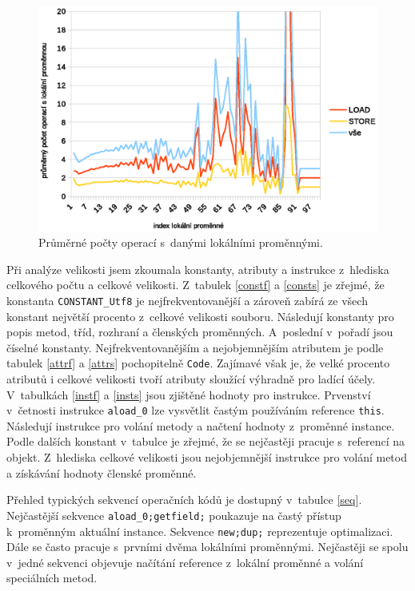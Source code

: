 \begin{figure}[h!]
\centering
\includegraphics[scale=0.9]{fig/locals.eps} 
\caption{Průměrné počty operací s~danými lokálními proměnnými.}\label{vars}
\end{figure}


Při analýze velikosti jsem zkoumala konstanty, atributy a instrukce z~hlediska celkového počtu a celkové velikosti. Z~tabulek \ref{constf} a \ref{consts} je zřejmé, že konstanta \texttt{CONSTANT\_Utf8} je nejfrekventovanější a zároveň zabírá ze všech konstant největší procento z~celkové velikosti souboru. Následují konstanty pro popis metod, tříd, rozhraní a členských proměnných. A~poslední v~pořadí jsou číselné konstanty.
Nejfrekventovanějším a nejobjemnějším atributem je podle tabulek \ref{attrf} a \ref{attrs} pochopitelně \texttt{Code}. Zajímavé však je, že velké procento atributů i celkové velikosti tvoří atributy sloužící výhradně pro ladící účely.
V~tabulkách \ref{instf} a \ref{insts} jsou zjištěné hodnoty pro instrukce. Prvenství v~četnosti instrukce \texttt{aload\_0} lze vysvětlit častým používáním reference \texttt{this}. Následují instrukce pro volání metody a načtení hodnoty z~proměnné instance. Podle dalších konstant v~tabulce je zřejmé, že se nejčastěji pracuje s~referencí na objekt.
Z~hlediska celkové velikosti jsou nejobjemnější instrukce pro volání metod a získávání hodnoty členské proměnné.

Přehled typických sekvencí operačních kódů je dostupný v~tabulce \ref{seq}. Nejčastější sekvence \texttt{aload\_0;getfield;} poukazuje na častý přístup k~proměnným aktuální instance. Sekvence \texttt{new;dup;} reprezentuje optimalizaci. Dále se často pracuje s~prvními dvěma lokálními proměnnými. Nejčastěji se spolu v~jedné sekvenci objevuje načítání reference z~lokální proměnné a volání speciálních metod.

